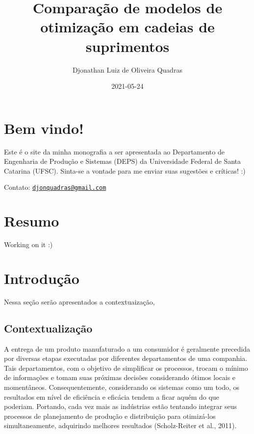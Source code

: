 \documentclass[
]{book}
\title{Comparação de modelos de otimização em cadeias de suprimentos}
\author{Djonathan Luiz de Oliveira Quadras}
\date{2021-05-24}
\begin{document}
\maketitle

{
\setcounter{tocdepth}{1}
\tableofcontents
}
\hypertarget{bem-vindo}{%
\chapter*{Bem vindo!}\label{bem-vindo}}

Este é o site da minha monografia a ser apresentada ao Departamento de Engenharia de Produção e Sistemas (DEPS) da Universidade Federal de Santa Catarina (UFSC). Sinta-se a vontade para me enviar suas sugestões e críticas! :)

Contato: \href{mailto:djonquadras@gmail.com}{\nolinkurl{djonquadras@gmail.com}}

\hypertarget{resumo}{%
\chapter*{Resumo}\label{resumo}}

Working on it :)

\hypertarget{introduuxe7uxe3o}{%
\chapter{Introdução}\label{introduuxe7uxe3o}}

Nessa seção serão apresentados a contextuaização,

\hypertarget{contextualizauxe7uxe3o}{%
\section{Contextualização}\label{contextualizauxe7uxe3o}}

A entrega de um produto manufaturado a um consumidor é geralmente precedida por diversas etapas executadas por diferentes departamentos de uma companhia. Tais departamentos, com o objetivo de simplificar os processos, trocam o mínimo de informações e tomam suas próximas decisões considerando ótimos locais e momentâneos. Consequentemente, considerando os sistemas como um todo, os resultados em nível de eficiência e eficácia tendem a ficar aquém do que poderiam. Portando, cada vez mais as indústrias estão tentando integrar seus processos de planejamento de produção e distribuição para otimizá-los simultaneamente, adquirindo melhores resultados (Scholz-Reiter et al., 2011).
\end{document}
